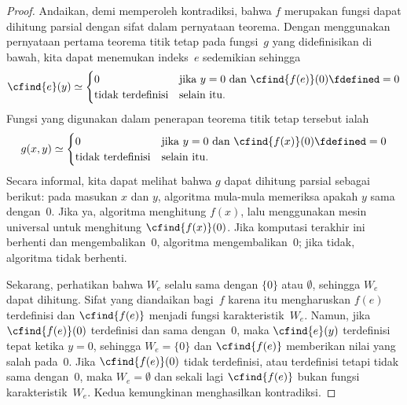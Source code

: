 \documentclass[../../../include/open-logic-section]{subfiles}
\begin{document}
\begin{proof}
Andaikan, demi memperoleh kontradiksi, bahwa $f$ merupakan fungsi dapat
dihitung parsial dengan sifat dalam pernyataan teorema. Dengan menggunakan
pernyataan pertama teorema titik tetap pada fungsi~$g$ yang didefinisikan di
bawah, kita dapat menemukan indeks~$e$ sedemikian sehingga
\[
\cfind{e}(y) \simeq
\begin{cases}
0 & \text{jika $y=0$ dan $\cfind{f(e)}(0) \fdefined = 0$} \\
\text{tidak terdefinisi} & \text{selain itu.}
\end{cases}
\]
Fungsi yang digunakan dalam penerapan teorema titik tetap tersebut ialah
\[
g(x,y) \simeq
\begin{cases}
0 & \text{jika $y=0$ dan $\cfind{f(x)}(0) \fdefined = 0$} \\
\text{tidak terdefinisi} & \text{selain itu.}
\end{cases}
\]
Secara informal, kita dapat melihat bahwa $g$ dapat dihitung parsial sebagai
berikut: pada masukan $x$ dan $y$, algoritma mula-mula memeriksa apakah $y$
sama dengan~$0$. Jika ya, algoritma menghitung $f(x)$, lalu menggunakan mesin
universal untuk menghitung $\cfind{f(x)}(0)$. Jika komputasi terakhir ini
berhenti dan mengembalikan~$0$, algoritma mengembalikan~$0$; jika tidak,
algoritma tidak berhenti.

Sekarang, perhatikan bahwa $W_e$ selalu sama dengan $\{0\}$ atau
$\emptyset$, sehingga $W_e$ dapat dihitung. Sifat yang diandaikan bagi~$f$
karena itu mengharuskan $f(e)$ terdefinisi dan $\cfind{f(e)}$ menjadi fungsi
karakteristik~$W_e$. Namun, jika $\cfind{f(e)}(0)$ terdefinisi dan sama
dengan~$0$, maka $\cfind{e}(y)$ terdefinisi tepat ketika $y=0$, sehingga
$W_e=\{0\}$ dan $\cfind{f(e)}$ memberikan nilai yang salah pada~$0$. Jika
$\cfind{f(e)}(0)$ tidak terdefinisi, atau terdefinisi tetapi tidak sama
dengan~$0$, maka $W_e=\emptyset$ dan sekali lagi $\cfind{f(e)}$ bukan fungsi
karakteristik~$W_e$. Kedua kemungkinan menghasilkan kontradiksi.
\end{proof}
\end{document}
